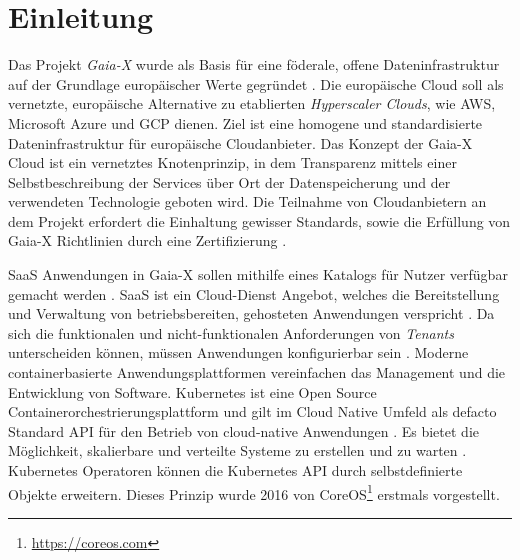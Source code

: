 \chapter{Einleitung}
\label{chap:einleitung}


Das Projekt \emph{Gaia-X} wurde als Basis für eine föderale, offene Dateninfrastruktur auf der Grundlage europäischer Werte gegründet \cite{GaiaXArchitecture2021}.
Die europäische Cloud soll als vernetzte, europäische Alternative zu etablierten \emph{Hyperscaler Clouds}, wie \ac{AWS},
Microsoft Azure und \ac{GCP} dienen. Ziel ist eine homogene und standardisierte Dateninfrastruktur für europäische Cloudanbieter.
Das Konzept der Gaia-X Cloud ist ein vernetztes Knotenprinzip, in dem Transparenz mittels einer Selbstbeschreibung der Services
über Ort der Datenspeicherung und der verwendeten Technologie geboten wird.
Die Teilnahme von Cloudanbietern an dem Projekt erfordert die Einhaltung gewisser Standards, 
sowie die Erfüllung von Gaia-X Richtlinien durch eine Zertifizierung \cite{BMWi2019}.


\ac{SaaS} Anwendungen in Gaia-X sollen mithilfe eines Katalogs für Nutzer verfügbar gemacht werden \cite{GXFS2021}.
\ac{SaaS} ist ein Cloud-Dienst Angebot, welches die Bereitstellung und Verwaltung von betriebsbereiten, 
gehosteten Anwendungen verspricht \cite{Krebs2012}.
Da sich die funktionalen und nicht-funktionalen Anforderungen von \emph{Tenants} unterscheiden können,
müssen Anwendungen konfigurierbar sein \cite{Schroeter2012}. 
Moderne containerbasierte Anwendungsplattformen vereinfachen das Management und die Entwicklung
von Software. Kubernetes \cite{kubernetes} ist eine Open Source Containerorchestrierungsplattform und gilt im
Cloud Native Umfeld als defacto Standard API für den Betrieb von cloud-native Anwendungen \cite{Burns2019}.
Es bietet die Möglichkeit, skalierbare und verteilte Systeme zu erstellen und zu warten \cite{Burns2019}.
Kubernetes Operatoren können die Kubernetes API durch selbstdefinierte Objekte erweitern. 
Dieses Prinzip wurde 2016 von CoreOS\footnote{\url{https://coreos.com}} erstmals vorgestellt.

